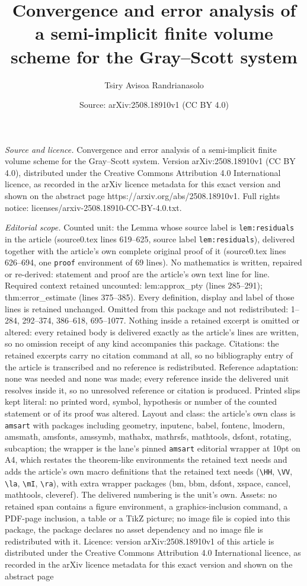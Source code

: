 \documentclass[10pt,a4paper]{amsart}
\title[Convergence and error analysis of a semi-implicit finite vol]{Convergence and error analysis of a semi-implicit finite volume scheme for the Gray--Scott system}
\author{Tsiry Avisoa Randrianasolo}
\date{Source: arXiv:2508.18910v1 (CC BY 4.0)}
\begin{document}
\maketitle

\noindent\emph{Source and licence.} Convergence and error analysis of a semi-implicit finite volume scheme for the Gray--Scott system. Version arXiv:2508.18910v1 (CC BY 4.0), distributed under the Creative Commons Attribution 4.0 International licence, as recorded in the arXiv licence metadata for this exact version and shown on the abstract page https://arxiv.org/abs/2508.18910v1. Full rights notice: licenses/arxiv-2508.18910-CC-BY-4.0.txt.\par\smallskip

\noindent\textit{Editorial scope.} Counted unit: the Lemma whose source label is \texttt{lem:residuals} in the article (source0.tex lines 619--625, source label \texttt{lem:residuals}), delivered together with the article's own complete original proof of it (source0.tex lines 626--694, one \texttt{proof} environment of 69 lines). No mathematics is written, repaired or re-derived: statement and proof are the article's own text line for line. Required context retained uncounted: lem:approx\_pty (lines 285--291); thm:error\_estimate (lines 375--385). Every definition, display and label of those lines is retained unchanged. Omitted from this package and not redistributed: 1--284, 292--374, 386--618, 695--1077. Nothing inside a retained excerpt is omitted or altered: every retained body is delivered exactly as the article's lines are written, so no omission receipt of any kind accompanies this package. Citations: the retained excerpts carry no citation command at all, so no bibliography entry of the article is transcribed and no reference is redistributed. Reference adaptation: none was needed and none was made; every reference inside the delivered unit resolves inside it, so no unresolved reference or citation is produced. Printed slips kept literal: no printed word, symbol, hypothesis or number of the counted statement or of its proof was altered. Layout and class: the article's own class is \texttt{amsart} with packages including geometry, inputenc, babel, fontenc, lmodern, amsmath, amsfonts, amssymb, mathabx, mathrsfs, mathtools, dsfont, rotating, subcaption; the wrapper is the lane's pinned \texttt{amsart} editorial wrapper at 10pt on A4, which restates the theorem-like environments the retained text needs and adds the article's own macro definitions that the retained text needs (\texttt{\textbackslash HH}, \texttt{\textbackslash VV}, \texttt{\textbackslash la}, \texttt{\textbackslash mI}, \texttt{\textbackslash ra}), with extra wrapper packages (bm, bbm, dsfont, xspace, cancel, mathtools, cleveref). The delivered numbering is the unit's own. Assets: no retained span contains a figure environment, a graphics-inclusion command, a PDF-page inclusion, a table or a TikZ picture; no image file is copied into this package, the package declares no asset dependency and no image file is redistributed with it. Licence: version arXiv:2508.18910v1 of this article is distributed under the Creative Commons Attribution 4.0 International licence, as recorded in the arXiv licence metadata for this exact version and shown on the abstract page 
\end{document}

